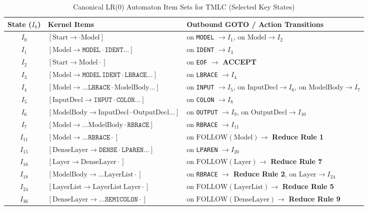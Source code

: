 \documentclass[11pt,a4paper]{article}
\begin{document}
\begin{table}[htbp]
\centering
\small
\caption{Canonical LR(0) Automaton Item Sets for TMLC (Selected Key States)}
\label{tab:lr0_states_sample}
\begin{tabular}{cp{6.8cm}p{4.8cm}}
\toprule
\textbf{State ($I_k$)} & \textbf{Kernel Items} & \textbf{Outbound GOTO / Action Transitions} \\
\midrule
$I_0$  & $[\text{Start} \rightarrow \cdot \text{Model}]$ & on \texttt{MODEL} $\rightarrow I_1$, on $\text{Model} \rightarrow I_2$ \\
$I_1$  & $[\text{Model} \rightarrow \texttt{MODEL} \cdot \texttt{IDENT} \dots]$ & on \texttt{IDENT} $\rightarrow I_3$ \\
$I_2$  & $[\text{Start} \rightarrow \text{Model} \cdot]$ & on \texttt{EOF} $\rightarrow$ \textbf{ACCEPT} \\
$I_3$  & $[\text{Model} \rightarrow \texttt{MODEL} \ \texttt{IDENT} \cdot \texttt{LBRACE} \dots]$ & on \texttt{LBRACE} $\rightarrow I_4$ \\
$I_4$  & $[\text{Model} \rightarrow \dots \texttt{LBRACE} \cdot \text{ModelBody} \dots]$ & on \texttt{INPUT} $\rightarrow I_5$, on $\text{InputDecl} \rightarrow I_6$, on $\text{ModelBody} \rightarrow I_7$ \\
$I_5$  & $[\text{InputDecl} \rightarrow \texttt{INPUT} \cdot \texttt{COLON} \dots]$ & on \texttt{COLON} $\rightarrow I_8$ \\
$I_6$  & $[\text{ModelBody} \rightarrow \text{InputDecl} \cdot \text{OutputDecl} \dots]$ & on \texttt{OUTPUT} $\rightarrow I_9$, on $\text{OutputDecl} \rightarrow I_{10}$ \\
$I_7$  & $[\text{Model} \rightarrow \dots \text{ModelBody} \cdot \texttt{RBRACE}]$ & on \texttt{RBRACE} $\rightarrow I_{11}$ \\
$I_{11}$ & $[\text{Model} \rightarrow \dots \texttt{RBRACE} \cdot]$ & on $\text{FOLLOW}(\text{Model}) \rightarrow$ \textbf{Reduce Rule 1} \\
$I_{15}$ & $[\text{DenseLayer} \rightarrow \texttt{DENSE} \cdot \texttt{LPAREN} \dots]$ & on \texttt{LPAREN} $\rightarrow I_{20}$ \\
$I_{16}$ & $[\text{Layer} \rightarrow \text{DenseLayer} \cdot]$ & on $\text{FOLLOW}(\text{Layer}) \rightarrow$ \textbf{Reduce Rule 7} \\
$I_{18}$ & $[\text{ModelBody} \rightarrow \dots \text{LayerList} \cdot]$ & on \texttt{RBRACE} $\rightarrow$ \textbf{Reduce Rule 2}, on $\text{Layer} \rightarrow I_{24}$ \\
$I_{24}$ & $[\text{LayerList} \rightarrow \text{LayerList} \ \text{Layer} \cdot]$ & on $\text{FOLLOW}(\text{LayerList}) \rightarrow$ \textbf{Reduce Rule 5} \\
$I_{36}$ & $[\text{DenseLayer} \rightarrow \dots \texttt{SEMICOLON} \cdot]$ & on $\text{FOLLOW}(\text{DenseLayer}) \rightarrow$ \textbf{Reduce Rule 9} \\
\bottomrule
\end{tabular}
\end{table}
\end{document}
